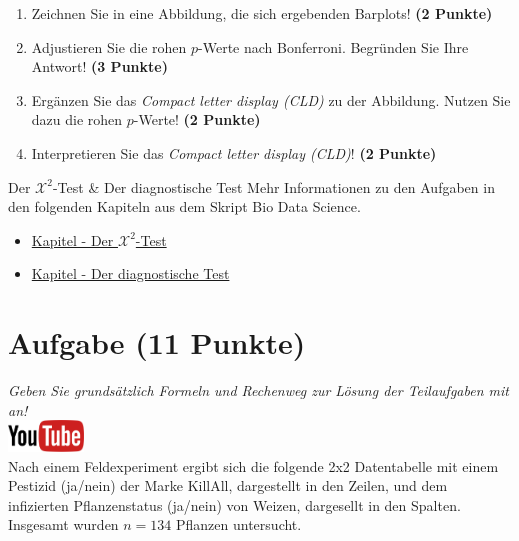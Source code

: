 \documentclass[a4paper, 9pt]{scrartcl}\usepackage[]{graphicx}\usepackage[]{xcolor}
\begin{document}
\begin{enumerate}
\item Zeichnen Sie in eine Abbildung, die sich ergebenden Barplots! \textbf{(2 Punkte)}
\item Adjustieren Sie die rohen $p$-Werte nach Bonferroni. Begr{\"u}nden Sie Ihre Antwort! \textbf{(3 Punkte)}
\item Erg{\"a}nzen Sie das \textit{Compact letter display (CLD)} zu der
  Abbildung. Nutzen Sie dazu die rohen $p$-Werte! \textbf{(2 Punkte)}
\item Interpretieren Sie das \textit{Compact letter display (CLD)}! \textbf{(2 Punkte)} 
\end{enumerate}

 
\clearpage
  \begin{graybox}{Der $\mathcal{X}^2$-Test \& Der diagnostische Test}
Mehr Informationen zu den Aufgaben in den folgenden Kapiteln aus dem Skript Bio Data Science.
  \begin{itemize}
  \item \href{https://jkruppa.github.io/stat-tests-chi-test.html}{Kapitel - Der $\mathcal{X}^2$-Test}
  \item \href{https://jkruppa.github.io/stat-tests-diagnostic.html}{Kapitel - Der diagnostische Test}
  \end{itemize}
\end{graybox}
\clearpage

\section{Aufgabe \hfill (11 Punkte)}

\textit{Geben Sie grunds{\"a}tzlich Formeln und Rechenweg zur L{\"o}sung der
  Teilaufgaben mit an!} \\[1Ex]

\hfill\href{https://youtu.be/-Kva5wc5Elw}{\includegraphics[width =
  2cm]{img/youtube}}\\[1Ex]




Nach einem Feldexperiment ergibt sich die folgende 2x2 Datentabelle mit einem
Pestizid (ja/nein) der Marke KillAll, dargestellt in den Zeilen, und
dem infizierten Pflanzenstatus (ja/nein) von Weizen, dargesellt in
den Spalten. Insgesamt wurden $n = 134$ Pflanzen untersucht.
\vspace{5Ex}
\end{document}
